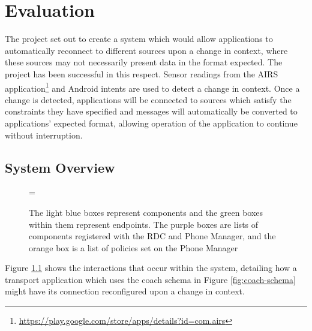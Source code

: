 \documentclass[12pt,twoside,notitlepage]{report}
\begin{document}
\cleardoublepage


\chapter{Evaluation}

The project set out to create a system which would allow applications to automatically reconnect to different sources upon a change in context, where these sources may not necessarily present data in the format expected. 
The project has been successful in this respect. Sensor readings from the AIRS application\footnote{\url{https://play.google.com/store/apps/details?id=com.airs}} and Android intents are used to detect a change in context. 
Once a change is detected, applications will be connected to sources which satisfy the constraints they have specified and messages will automatically be converted to applications' expected format, allowing operation of the application to continue without interruption.

\section{System Overview}

\begin{figure}[tbh]
\epsfxsize=\hsize
\centerline{}
\caption[System Overview]{The light blue boxes represent components and the green boxes within them represent endpoints. The purple boxes are lists of components registered with the RDC and Phone Manager, and the orange box is a list of policies set on the Phone Manager}
\label{fig:system_overview}
\end{figure}

Figure \ref{fig:system_overview} shows the interactions that occur within the system, detailing how a transport application which uses the coach schema in Figure \ref{fig:coach-schema} might have its connection reconfigured upon a change in context.
\end{document}
